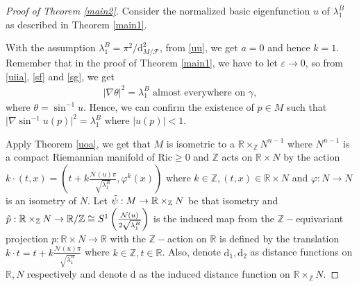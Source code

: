 \documentclass[11pt]{amsart}
\def\d{\mathrm{d}}
\def\ric{\mathrm{Ric}}
\begin{document}
\begin{proof}[Proof of Theorem \ref{main2}]
Consider the normalized basic eigenfunction $u$ of $\lambda_1^B$ as described in Theorem \ref{main1}.

    With the assumption $\lambda_1^B=\pi^2/\d_{M/\mathcal{F}}^2$, from \ref{uu}, we get $a=0$ and hence $k=1$. Remember that in the proof of Theorem \ref{main1}, we have to let $\varepsilon\to 0$, so from \ref{uiia}, \ref{sf} and \ref{sg}, we get 
\begin{align}\label{uiiia}
    \vert\nabla\theta\vert^2=\lambda_1^B \text{ almost everywhere on }\gamma,
\end{align} where $\theta=\sin^{-1}u$. Hence, we can confirm the existence of $p\in M$ such that $\vert\nabla\sin^{-1} u(p)\vert^2=\lambda_1^B$ where $\vert u(p)\vert<1$.

Apply Theorem \ref{uoa}, we get that $M$ is isometric to a $\mathbb{R}\times_\mathbb{Z} N^{n-1}$ where $N^{n-1}$ is a compact Riemannian manifold of $\ric\geq 0$ and $\mathbb{Z}$ acts on $\mathbb{R}\times N$ by the action $k\cdot (t,x)=\left(t+k\frac{\mathcal{N}(u)\pi}{\sqrt{\lambda_1^B}},\varphi^k(x)\right)$ where $k\in \mathbb{Z},(t,x)\in \mathbb{R}\times N$ and $\varphi:N\to N$ is an isometry of $N$.  Let $\Tilde{\psi}: M\to \mathbb{R}\times_\mathbb{Z} N$ be that isometry and $\Tilde{p}:\mathbb{R}\times_\mathbb{Z}N\to \mathbb{R}/\mathbb{Z}\cong S^1\left(\frac{\mathcal{N}(u)}{2\sqrt{\lambda_1^B}}\right)$ is the induced map from the $\mathbb{Z}-$equivariant projection $p:\mathbb{R}\times N\to\mathbb{R}$ with the $\mathbb{Z}-$action on $\mathbb{R}$ is defined by the translation $k\cdot t=t+k\frac{\mathcal{N}(u)\pi}{\sqrt{\lambda_1^B}}$ where $k\in \mathbb{Z},t\in\mathbb{R}$. Also, denote $\d_1,\d_2$ as distance functions on $\mathbb{R},N$ respectively and denote $\d$ as the induced distance function on $\mathbb{R}\times_\mathbb{Z}N$. 


\end{proof}
\end{document}
